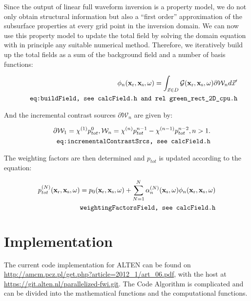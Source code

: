 \documentclass[10pt,a4paper]{article}
\begin{document}
Since the output of linear full waveform inversion is a property model, we do
not only obtain structural information but also a ``first order''
approximation of the
subsurface properties at every grid point in the inversion domain. We
can now use this property model to update the total field by solving
the domain equation with in principle any suitable numerical method.
Therefore, we iteratively build up the total fields as a sum of the
background field and a number of basis functions:

\begin{align} \label{eq:buildField} \phi_n
(\mathbf{x_\text{r}},\mathbf{x_\text{s}},\omega) = \int_{\vec{x}\in D}
\mathcal{G} (\mathbf{x_\text{r}},\mathbf{x_\text{s}},\omega)\partial
\mathcal{W}_n d\vec{x}' \\
\tag*{\texttt{eq:buildField, see calcField.h and rel green\_rect\_2D\_cpu.h}}
\end{align}

And the incremental contrast sources $\partial \mathcal{W}_n$ are given by:

\begin{align} \label{eq:incrementalContrastSrcs} \partial \mathcal{W}_1 = \chi^{(1)}
p^{0}_{tot} , \mathcal{W}_n = \chi^{(n)} p^{n-1}_{tot} - \chi^{(n-1)}
p^{n-2}_{tot}, n > 1.\\
\tag*{\texttt{eq:incrementalContrastSrcs, see calcField.h}}
\end{align}

The weighting factors are then determined and $p_{tot}$ is updated
according to the equation:

\begin{align} \label{eq:weightingFactorsField} p^{(N)}_{tot}
(\mathbf{x_\text{r}},\mathbf{x_\text{s}},\omega) =  p_0
(\mathbf{x_\text{r}},\mathbf{x_\text{s}},\omega) + \sum\limits_{N=1}^N
\alpha^{(N)}_n (\mathbf{x_\text{s}},\omega) \phi_n
(\mathbf{x_\text{r}},\mathbf{x_\text{s}},\omega)\\
\tag*{\texttt{weightingFactorsField, see calcField.h}}
\end{align}



\section{Implementation}
The current code implementation for ALTEN can be found on
\url{http://amcm.pcz.pl/get.php?article=2012_1/art_06.pdf}, with the
host at \url{https://git.alten.nl/parallelized-fwi.git}.
The Code Algorithm is complicated and can be divided into the
mathematical functions and the computational functions.
\end{document}

